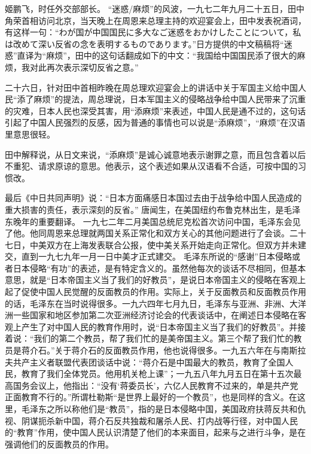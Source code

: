\begin{maonote}
姬鹏飞，时任外交部部长。
“迷惑/麻烦”的风波，一九七二年九月二十五日，田中角荣首相访问北京，当天晚上在周恩来总理主持的欢迎宴会上，田中发表祝酒词，有这样一句：“{\mingchao わが国が中国国民に多大なご迷惑をおかけしたことについて，私は改めて深い反省の念を表明するものであります}。”日方提供的中文稿稿将“{\mingchao 迷惑}”直译为“麻烦”，田中的这句话翻成如下的中文：“我国给中国国民添了很大的麻烦，我对此再次表示深切反省之意。”

二十六日，针对田中首相昨晚在周总理欢迎宴会上的讲话中关于军国主义给中国人民“添了麻烦”的提法，周总理说，日本军国主义的侵略战争给中国人民带来了沉重的灾难，日本人民也深受其害，用“添麻烦”来表述，中国人民是通不过的，这句话引起了中国人民强烈的反感，因为普通的事情也可以说是“添麻烦”，“麻烦”在汉语里意思很轻。

田中解释说，从日文来说，“添麻烦”是诚心诚意地表示谢罪之意，而且包含着以后不重犯、请求原谅的意思。他表示，这个表述如果从汉语看不合适，可按中国的习惯改。

最后《中日共同声明》说：“日本方面痛感日本国过去由于战争给中国人民造成的重大损害的责任，表示深刻的反省。”
唐闻生，在美国纽约布鲁克林出生，是毛泽东晚年的重要翻译。
一九七二年二月美国总统尼克松首次访问中国，毛泽东会见了他。他同周恩来总理就两国关系正常化和双方关心的其他问题进行了会谈。二十七日，中美双方在上海发表联合公报，使中美关系开始走向正常化。但双方并未建交，直到一九七九年一月一日中美才正式建交。
毛泽东所说的“感谢”日本侵略或者日本侵略“有功”的表述，是有特定含义的。虽然他每次的谈话不尽相同，但基本意思，就是“日本帝国主义当了我们的好教员”，是说日本帝国主义的侵略在客观上起了促使中国人民觉醒的反面教员的作用。实际上，关于反面教员和反面教员作用的话，毛泽东在当时说得很多。一九六四年七月九日，毛泽东与亚洲、非洲、大洋洲一些国家和地区参加第二次亚洲经济讨论会的代表谈话中，在阐述日本侵略在客观上产生了对中国人民的教育作用时，说“日本帝国主义当了我们的好教员”。并接着说：“我们的第二个教员，帮了我们忙的是美帝国主义。第三个帮了我们忙的教员是蒋介石。”关于蒋介石的反面教员作用，他也说得很多。一九五六年在与南斯拉夫共产主义者联盟代表团谈话中说：“蒋介石是中国最大的教员，教育了全国人民，教育了我们全体党员。他用机关枪上课”；一九五八年九月五日在第十五次最高国务会议上，他指出：“没有‘蒋委员长’，六亿人民教育不过来的，单是共产党正面教育不行的。”所谓杜勒斯“是世界上最好的一个教员”，也是同样的含义。在这里，毛泽东之所以称他们是“教员”，指的是日本侵略中国，美国政府扶蒋反共和仇视、阴谋扼杀新中国，蒋介石反共独裁和屠杀人民、打内战等行径，对中国人民的“教育”作用，使中国人民认识清楚了他们的本来面目，起来与之进行斗争，是在强调他们的反面教员的作用。


\end{maonote}
